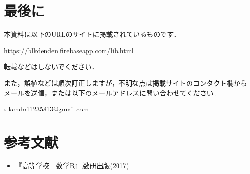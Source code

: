 \documentclass[dvipdfmx]{jsarticle}
\begin{document}
    \section*{最後に}
    本資料は以下のURLのサイトに掲載されているものです．

    {\centering \url{https://blkdenden.firebaseapp.com/lib.html}\\}

    転載などはしないでください．

    また，誤植などは順次訂正しますが，不明な点は掲載サイトのコンタクト欄からメールを送信，または以下のメールアドレスに問い合わせてください．

    {\centering \url{s.kondo11235813@gmail.com}\\}

    \section*{参考文献}
    \begin{itemize}
        \item 『高等学校　数学B』,数研出版(2017)
    \end{itemize}
\end{document}
